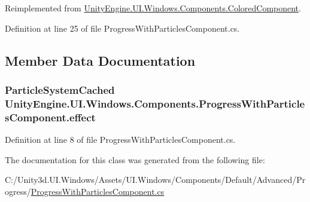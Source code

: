 Reimplemented from \hyperlink{class_unity_engine_1_1_u_i_1_1_windows_1_1_components_1_1_colored_component_a974f3b5d7da183afd669d1714dfa8ab1}{Unity\+Engine.\+U\+I.\+Windows.\+Components.\+Colored\+Component}.



Definition at line 25 of file Progress\+With\+Particles\+Component.\+cs.



\subsection{Member Data Documentation}
\hypertarget{class_unity_engine_1_1_u_i_1_1_windows_1_1_components_1_1_progress_with_particles_component_ad0bb5e157b84296881df86f447caa85c}{}
\subsubsection[{effect}]{\setlength{\rightskip}{0pt plus 5cm}Particle\+System\+Cached Unity\+Engine.\+U\+I.\+Windows.\+Components.\+Progress\+With\+Particles\+Component.\+effect}\label{class_unity_engine_1_1_u_i_1_1_windows_1_1_components_1_1_progress_with_particles_component_ad0bb5e157b84296881df86f447caa85c}


Definition at line 8 of file Progress\+With\+Particles\+Component.\+cs.



The documentation for this class was generated from the following file\+:\begin{DoxyCompactItemize}
\item 
C\+:/\+Unity3d.\+U\+I.\+Windows/\+Assets/\+U\+I.\+Windows/\+Components/\+Default/\+Advanced/\+Progress/\hyperlink{_progress_with_particles_component_8cs}{Progress\+With\+Particles\+Component.\+cs}\end{DoxyCompactItemize}
